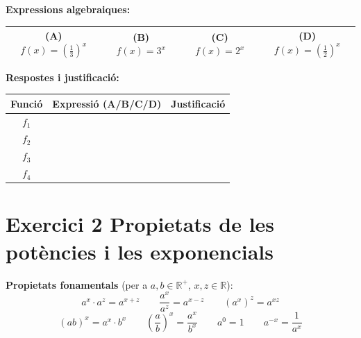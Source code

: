 \documentclass[12pt,a4paper]{article}
\begin{document}
\noindent\textbf{Expressions algebraiques:}

\vspace{0.3cm}
\begin{center}
\renewcommand{\arraystretch}{1.8}
\begin{tabular}{|c|c|c|c|}
\hline
\textbf{(A)} $\displaystyle f(x)=\left(\frac{1}{3}\right)^x$ &
\textbf{(B)} $\displaystyle f(x)=3^x$ &
\textbf{(C)} $\displaystyle f(x)=2^x$ &
\textbf{(D)} $\displaystyle f(x)=\left(\frac{1}{2}\right)^x$ \\
\hline
\end{tabular}
\end{center}

\vspace{0.4cm}

\noindent\textbf{Respostes i justificaci\'o:}

\begin{center}
\renewcommand{\arraystretch}{2.2}
\begin{tabular}{|c|p{3cm}|p{8cm}|}
\hline
\textbf{Funci\'o} & \textbf{Expressi\'o (A/B/C/D)} & \textbf{Justificaci\'o} \\
\hline
$f_1$ & & \\
\hline
$f_2$ & & \\
\hline
$f_3$ & & \\
\hline
$f_4$ & & \\
\hline
\end{tabular}
\end{center}

\newpage

\section*{Exercici 2 \quad Propietats de les pot\`encies i les exponencials}

\begin{recordatori}
\textbf{Propietats fonamentals} (per a $a, b \in \mathbb{R}^+$, $x, z \in \mathbb{R}$):
\[
a^x \cdot a^z = a^{x+z} \qquad \frac{a^x}{a^z} = a^{x-z} \qquad (a^x)^z = a^{xz}
\]
\[
(ab)^x = a^x \cdot b^x \qquad \left(\frac{a}{b}\right)^x = \frac{a^x}{b^x} \qquad a^0 = 1 \qquad a^{-x} = \frac{1}{a^x}
\]
\end{recordatori}

\vspace{0.4cm}
\end{document}
